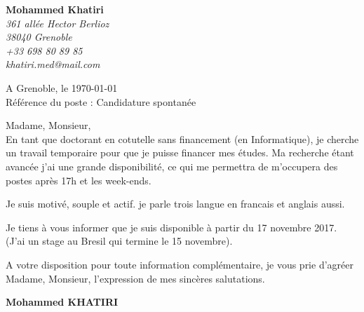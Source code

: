 \documentclass[11pt]{letter}
\begin{document}
 \sffamily
 \hfill
 \begin{flushleft}
 {\bfseries Mohammed Khatiri}\\[.35ex]
 \small\itshape
 361 allée Hector Berlioz\\
 38040 Grenoble\\[.35ex]
 +33 698 80 89 85\\
 khatiri.med@mail.com
 \end{flushleft}
 \begin{flushright}
 A Grenoble, le \today \\
 Référence du poste : Candidature spontanée
 \end{flushright}
 Madame, Monsieur,\\

 En tant que doctorant en cotutelle sans financement (en Informatique), je cherche un travail temporaire pour que je puisse financer mes études. 
Ma recherche étant avancée j'ai une grande disponibilité, ce qui me permettra de m'occupera des postes après 17h et les week-ends.

Je suis motivé, souple et actif. je parle trois langue en francais et anglais aussi.  

 Je tiens à vous informer que je suis disponible à partir du 17 novembre 2017. (J'ai un stage au Bresil qui termine le 15 novembre).

A votre disposition pour toute information complémentaire, je vous prie d'agréer Madame, Monsieur, l'expression de mes sincères salutations.\\


 \begin{center}
 {\bfseries Mohammed KHATIRI}\\
 \end{center}
 \vfill
 
\end{document}
